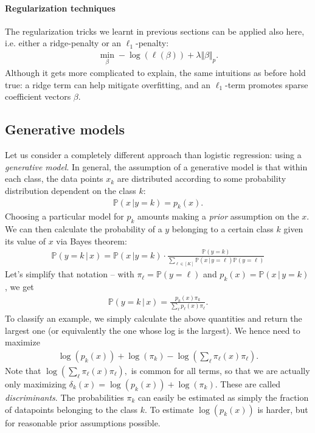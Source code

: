 \documentclass{article}
\newcommand{\norm}[1]{\Vert #1 \Vert}
\begin{document}
\paragraph{Regularization techniques} The regularization tricks we learnt in previous sections can be applied also here, i.e. either a ridge-penalty or an $\ell_1$-penalty:
\begin{align*}
    \min_\beta - \log(\ell(\beta)) + \lambda \norm{\beta}_p.
\end{align*}
Although it gets more complicated to explain, the same intuitions as before hold true: a ridge term can help mitigate overfitting, and an $\ell_1$-term promotes sparse coefficient vectors $\beta$.


\subsection{Generative models} 
Let us consider a completely different approach than logistic regression: using a \emph{generative model}. In general, the assumption of a generative model is that within each class, the data points $x_k$ are distributed according to some probability distribution dependent on the class $k$:
\begin{align*}
    \mathbb{P}(x \, \vert y=k)= p_k(x). 
\end{align*}
Choosing a particular model for $p_k$ amounts making a \emph{prior} assumption on the $x$. We can then calculate the probability of a $y$ belonging to a certain class $k$ given its value of $x$ via Bayes theorem:
\begin{align*}
    \mathbb{P}(y=k \, \vert \, x) = \mathbb{P}(x \, \vert y=k) \cdot \frac{\mathbb{P}(y=k)}{\sum_{\ell\in [K]}\mathbb{P}(x \, \vert \, y=\ell) \mathbb{P}(y=\ell)}
\end{align*}
Let's simplify that notation -- with $\pi_\ell= \mathbb{P}(y=\ell)$ and $p_k(x) = \mathbb{P}(x \, \vert \, y=k)$, we get
\begin{align*}
    \mathbb{P}(y=k \, \vert \, x) = \frac{p_k(x) \pi_k}{\sum_\ell p_\ell(x)\pi_\ell}.
\end{align*}
To classify an example, we simply calculate the above quantities and return the largest one (or equivalently the one whose log is the largest). We hence need to maximize
\begin{align*}
    \log(p_k(x)) + \log(\pi_k) - \log\left( \sum_{\ell}\pi_\ell(x) \pi_\ell\right).
\end{align*}
Note that $\log\left( \sum_{\ell}\pi_\ell(x) \pi_\ell\right),$ is common for all terms, so that we are actually only maximizing $\delta_k(x)=\log(p_k(x))+\log(\pi_k)$. These are called \emph{discriminants}. The probabilities $\pi_k$ can easily be estimated as simply the fraction of datapoints belonging to the class $k$. To estimate $\log(p_k(x))$ is harder, but for reasonable prior assumptions possible. 
\end{document}
